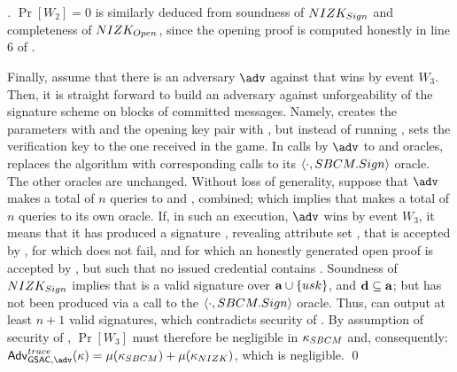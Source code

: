 \begin{proof}[]
  $\Pr[W_2] = 0$ is similarly deduced from soundness of $NIZK_{Sign}$ and
  completeness of $NIZK_{Open}$, since the opening proof is computed
  honestly in line 6 of \ExpGSACTrace.

  Finally, assume that there is an adversary $\adv$ against \ExpGSACTrace that
  wins by event $W_3$. Then, it is straight forward to build an adversary \advB
  against unforgeability of the signature scheme on blocks of committed
  messages. Namely, \advB creates the parameters with \Setup and the opening
  key pair with \OKeyGen, but instead of running \IKeyGen, sets the verification
  key to the one received in the \ExpSBCMOMF game. In calls by $\adv$ to \OBTISS
  and \ISSUE oracles, \advB replaces the \Issue algorithm with corresponding
  calls to its $\langle \cdot,SBCM.Sign \rangle$ oracle. The other oracles are
  unchanged. Without loss of generality, suppose that $\adv$ makes a total of
  $n$ queries to \OBTISS and \ISSUE, combined; which implies that \advB makes
  a total of $n$ queries to its own oracle. If, in such an execution, $\adv$
  wins by event $W_3$, it means that it has produced a signature \sig, revealing
  attribute set \dattrs, that is accepted by \Verify, for which \Open does not
  fail, and for which an honestly generated open proof is accepted by \Judge,
  but such that no issued credential contains \dattrs. Soundness of
  $NIZK_{Sign}$ implies that \sig is a valid signature over $\mathbf{a} \cup
  \lbrace usk \rbrace$, and $\mathbf{d} \subseteq \mathbf{a}$; but \sig has not been
  produced via a call to the $\langle \cdot,SBCM.Sign \rangle$ oracle. Thus,
  \advB can output at least $n+1$ valid signatures, which contradicts security
  of \SBCM.
  By assumption of security of \SBCM, $\Pr[W_3]$ must therefore be negligible in
  $\kappa_{SBCM}$ and, consequently: $\AdvGSACTrace(\secpar) = \negl(\SBCMsecpar)+
  \negl(\NIZKsecpar)$, which is negligible.  
  \qed
\end{proof}

